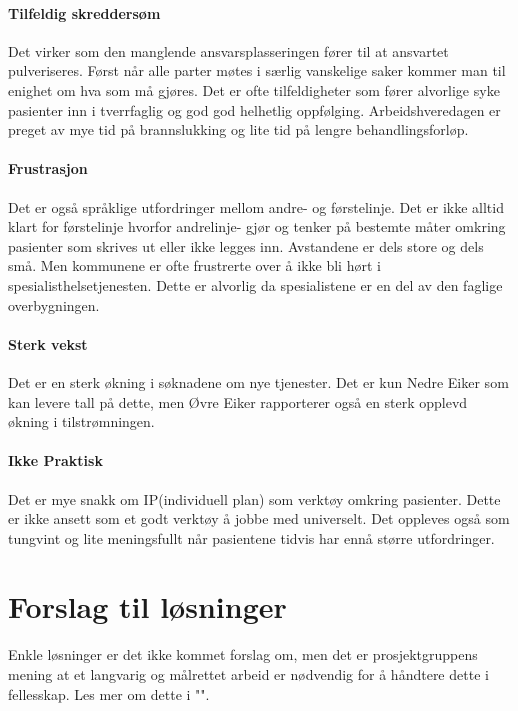 \documentclass[11pt]{report} %
\begin{document}
                  \paragraph{Tilfeldig skreddersøm\\} 
                    Det virker som den manglende ansvarsplasseringen fører til at ansvartet pulveriseres. Først når alle parter møtes i særlig vanskelige saker kommer man til enighet om hva som må gjøres. Det er ofte tilfeldigheter som fører alvorlige syke pasienter inn i tverrfaglig og god god helhetlig oppfølging. Arbeidshveredagen er preget av mye tid på brannslukking og lite tid på lengre behandlingsforløp.\\
                  \paragraph{Frustrasjon\\}  
                    Det er også språklige utfordringer mellom andre- og førstelinje. Det er ikke alltid klart for førstelinje hvorfor andrelinje- gjør og tenker på bestemte måter omkring pasienter som skrives ut eller ikke legges inn. Avstandene er dels store og dels små. Men kommunene er ofte frustrerte over å ikke bli hørt i spesialisthelsetjenesten. Dette er alvorlig da spesialistene er en del av den faglige overbygningen.\\
                  \paragraph{Sterk vekst\\}  
                    Det er en sterk økning i søknadene om nye tjenester. Det er kun Nedre Eiker som kan levere tall på dette, men Øvre Eiker rapporterer også en sterk opplevd økning i tilstrømningen.\\
                  \paragraph{Ikke Praktisk\\}  
                    Det er mye snakk om IP(individuell plan) som verktøy omkring pasienter. Dette er ikke ansett som et godt verktøy å jobbe med universelt. Det oppleves også som tungvint og lite meningsfullt når pasientene tidvis har ennå større utfordringer.

                \section{Forslag til løsninger}\label{chap:disk_losn}
                  Enkle løsninger er det ikke kommet forslag om, men det er prosjektgruppens mening at et langvarig og målrettet arbeid er nødvendig for å håndtere dette i fellesskap. Les mer om dette i "".
    
\end{document}
